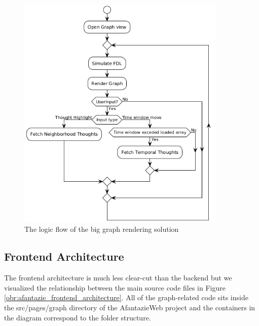 \begin{figure}[h]\centering
    \includegraphics[width=100mm, keepaspectratio]{img/afantazie_graph_view_flow.png}
    \caption{The logic flow of the big graph rendering solution}
    \label{obr:afantazie_action_flow}
\end{figure}

\subsection{Frontend Architecture}
\label{sec:frontend_architecture}

The frontend architecture is much less clear-cut than the backend
but we visualized the relationship between the main source code files in Figure
\ref{obr:afantazie_frontend_architecture}.
All of the graph-related code sits inside the src/pages/graph directory of the AfantazieWeb project
and the containers in the diagram correspond to the folder structure.

